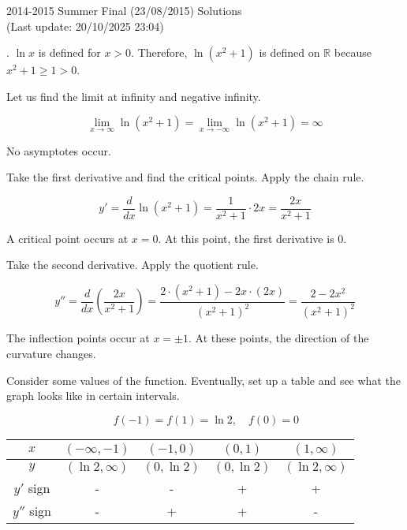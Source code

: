 \documentclass{article}
\begin{document}
\newpage

\begin{center}
2014-2015 Summer Final (23/08/2015) Solutions\\
(Last update: 20/10/2025 23:04)
\end{center}

. $\ln x$ is defined for $x>0$. Therefore, $\ln\left(x^2+1\right)$ is defined on $\mathbb{R}$ because $x^2+1\geq1>0$.

\hfill

\noindent Let us find the limit at infinity and negative infinity.

\begin{equation*}\lim_{x\to\infty}\ln\left(x^2+1\right)=\lim_{x\to-\infty}\ln\left(x^2+1\right)=\infty\end{equation*}

\hfill

\noindent No asymptotes occur.

\hfill

\noindent Take the first derivative and find the critical points. Apply the chain rule.

\[y'=\frac d{dx}\ln\left(x^2+1\right)=\frac1{x^2+1}\cdot 2x=\frac{2x}{x^2+1}\]

\hfill

\noindent A critical point occurs at $x=0$. At this point, the first derivative is $0$.

\hfill

\noindent Take the second derivative. Apply the quotient rule.

\[y''=\frac d{dx}\left(\frac{2x}{x^2+1}\right)=\frac{2\cdot\left(x^2+1\right)-2x\cdot(2x)}{\left(x^2+1\right)^2}=\frac{2-2x^2}{\left(x^2+1\right)^2}\]

\hfill

\noindent The inflection points occur at $x=\pm1$. At these points, the direction of the curvature changes.

\hfill

\noindent Consider some values of the function. Eventually, set up a table and see what the graph looks like in certain intervals.

\begin{equation*}\,f\left(-1\right)=f\left(1\right)=\ln2,\quad f(0)=0\end{equation*}

\begin{center}
    \large
    \begin{tabular}{|c|cccc|} 
    \hline
        $x$&$\left(-\infty,-1\right)$&$\left(-1,0\right)$&$\left(0,1\right)$&$\left(1, \infty\right)$\\
        \hline
        $y$&$(\ln2,\infty)$&$(0,\ln2)$&$(0,\ln2)$&$(\ln2,\infty)$\\
        \hline
        $y'$ sign&-&-&+&+\\
        \hline
        $y''$ sign&-&+&+&-\\
        \hline
    \end{tabular}
\end{center}
\end{document}
